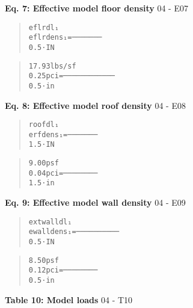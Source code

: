 \documentclass[12pt,notitle,letterpaper]{report}
\begin{document}
\textbf{Eq. 7: Effective model floor density}  \hfill 04 - E07

\begin{quote}
\begin{alltt}
            eflrdl₁
eflrdens₁ = ───────
             0.5⋅IN
\end{alltt}
\end{quote}

\begin{quote}
\begin{alltt}
           17.93 lbs/sf
0.25 pci = ────────────
              0.5⋅in
\end{alltt}
\end{quote}

\textbf{Eq. 8: Effective model roof density}  \hfill 04 - E08

\begin{quote}
\begin{alltt}
           roofdl₁
erfdens₁ = ───────
            1.5⋅IN
\end{alltt}
\end{quote}

\begin{quote}
\begin{alltt}
           9.00 psf
0.04 pci = ────────
            1.5⋅in
\end{alltt}
\end{quote}

\textbf{Eq. 9: Effective model wall density}  \hfill 04 - E09

\begin{quote}
\begin{alltt}
             extwalldl₁
ewalldens₁ = ──────────
               0.5⋅IN
\end{alltt}
\end{quote}

\begin{quote}
\begin{alltt}
           8.50 psf
0.12 pci = ────────
            0.5⋅in
\end{alltt}
\end{quote}

\vspace{.05in}

\textbf{Table 10: Model loads}  \hfill 04 - T10

  \vspace{.05in}

\nopagebreak
\end{document}
